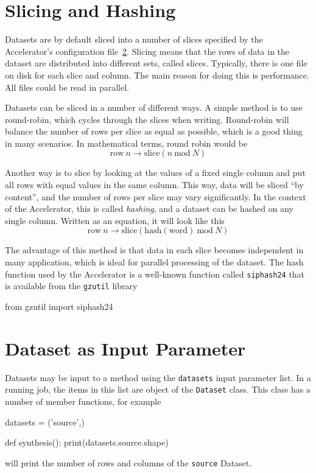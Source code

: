 \section{Slicing and Hashing}
Datasets are by default sliced into a number of slices specified by
the Accelerator's configuration file~\ref{}.  Slicing means that the
rows of data in the dataset are distributed into different sets,
called slices.  Typically, there is one file on disk for each slice
and column.  The main reason for doing this is performance.  All files
could be read in parallel.

Datasets can be sliced in a number of different ways.  A simple method
is to use round-robin, which cycles through the slices when writing.
Round-robin will balance the number of rows per slice as equal as
possible, which is a good thing in many scenarios.  In mathematical
terms, round robin would be
\begin{equation}
  \textrm{row}~n \longrightarrow \textrm{slice}(n~\textrm{mod}~N)
\end{equation}

Another way is to slice by looking at the values of a fixed single
column and put all rows with equal values in the same column.  This
way, data will be sliced ``by content'', and the number of rows per
slice may vary significantly.  In the context of the Accelerator, this
is called \emph{hashing}, and a dataset can be hashed on any single
column.  Written as an equation, it will look like this
\begin{equation}
\textrm{row}~n \longrightarrow \textrm{slice}(\textrm{hash}(\textrm{word})~\textrm{mod}~N)
\end{equation}

The advantage of this method is that data in each slice becomes
independent in many application, which is ideal for parallel
processing of the dataset.  The hash function used by the Accelerator
is a well-known function called \texttt{siphash24} that is available
from the \texttt{gzutil} library
\begin{python}
from gzutil import siphash24
\end{python}



\section{Dataset as Input Parameter}
Datasets may be input to a method using the \texttt{datasets} input
parameter list.  In a running job, the items in this list are object
of the \texttt{Dataset} class.  This class has a number of member
functions, for example
\begin{python}
datasets = ('source',)

def synthesis():
  print(datasets.source.shape)
\end{python}
will print the number of rows and columns of the \texttt{source}
Dataset.


